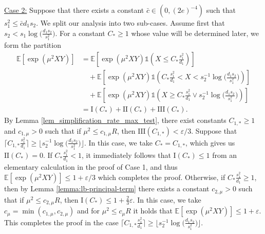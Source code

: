 \documentclass{article}
\newcommand{\EE}{\mathbb{E}}
\newcommand{\one}{\mathds{1}}
\newcommand{\eps}{\varepsilon} %
\newcommand{\Ct}{C_{*}}
\theoremstyle{remark}
\begin{document}
\noindent \underline{Case 2:} Suppose that there exists a constant $\bar{c} \in (0, (2e)^{-4})$ such that $s_1^2 \leq \bar{c}d_1s_2$. We split our analysis into two sub-cases. Assume first that $s_2 < s_1\log\big(\frac{d_1s_2}{s_1^2}\big)$. For a constant $C_* \geq 1$ whose value will be determined later, we form the partition
\begin{align*}
    \EE[\exp(\mu^2XY)] &= \EE[\exp(\mu^2XY)\one(X \leq \Ct \frac{s_1^2}{d_1})] \\
    &\quad +  \EE[\exp(\mu^2XY)\one(\Ct \frac{s_1^2}{d_1} < X < s_2^{-1}\log\big(\frac{d_1s_2}{s_1^2}\big))] \\
    &\quad + \EE[\exp(\mu^2XY)\one(X \geq \Ct \frac{s_1^2}{d_1} \lor s_2^{-1}\log\big(\frac{d_1s_2}{s_1^2}\big) )] \\
    &= \text{I}(C_*) + \text{II}(C_*) + \text{III}(C_*).
\end{align*}
By Lemma \ref{lem_simplification_rate_max_test}, there exist constants $C_{1,*} \geq 1$ and $c_{1, \mu} > 0$ such that if $\mu^2 \leq c_{1, \mu}R$, then $\text{III}(C_{1,*}) < \eps/3$. Suppose that $\lceil C_{1,*}\frac{s_1^2}{d_1}\rceil \geq \lfloor s_2^{-1}\log \big(\frac{d_1s_2}{s_1^2}\big)\rfloor$. In this case, we take $C_* = C_{1,*}$, which gives us $\text{II}(C_*) = 0$. If $C_* \frac{s_1^2}{d_1} < 1$, it immediately follows that $\text{I}(C_*) \leq 1$ from an elementary calculation in the proof of Case 1, and thus $\EE[\exp(\mu^2XY)] \leq 1 + \eps/3$ which completes the proof. Otherwise, if $C_* \frac{s_1^2}{d_1} \geq 1$, then by Lemma \ref{lemma:lb-principal-term} there exists a constant $c_{2,\mu} > 0$ such that if $\mu^2 \leq c_{2,\mu}R$, then $\text{I}(C_*) \leq 1 + \frac23\eps$. In this case, we take $c_\mu = \min(c_{1, \mu}, c_{2, \mu})$ and for $\mu^2 \leq c_{\mu}R$ it holds that $\EE[\exp(\mu^2XY)]\leq 1 + \eps$. This completes the proof in the case $\lceil C_{1,*}\frac{s_1^2}{d_1}\rceil \geq \lfloor s_2^{-1}\log \big(\frac{d_1s_2}{s_1^2}\big)\rfloor$.
\end{document}

